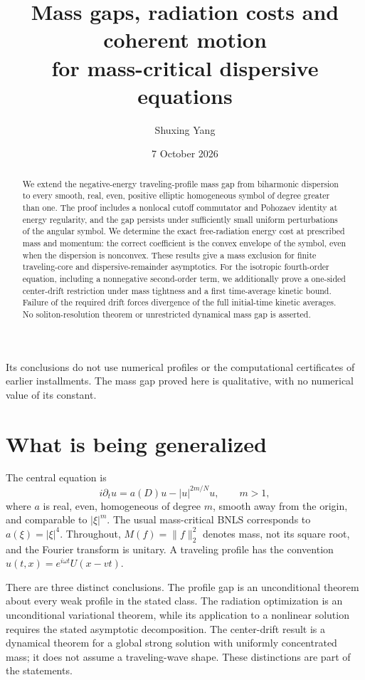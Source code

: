 \documentclass[11pt,a4paper]{article}
\title{Mass gaps, radiation costs and coherent motion\\for mass-critical dispersive equations}
\author{Shuxing Yang}
\date{7 October 2026}
\theoremstyle{remark}\newtheorem{remark}[theorem]{Remark}
\begin{document}
\maketitle
\begin{abstract}
We extend the negative-energy traveling-profile mass gap from biharmonic dispersion to every smooth, real, even, positive elliptic homogeneous symbol of degree greater than one. The proof includes a nonlocal cutoff commutator and Pohozaev identity at energy regularity, and the gap persists under sufficiently small uniform perturbations of the angular symbol. We determine the exact free-radiation energy cost at prescribed mass and momentum: the correct coefficient is the convex envelope of the symbol, even when the dispersion is nonconvex. These results give a mass exclusion for finite traveling-core and dispersive-remainder asymptotics. For the isotropic fourth-order equation, including a nonnegative second-order term, we additionally prove a one-sided center-drift restriction under mass tightness and a first time-average kinetic bound. Failure of the required drift forces divergence of the full initial-time kinetic averages. No soliton-resolution theorem or unrestricted dynamical mass gap is asserted.
\end{abstract}
 Its conclusions do not use numerical profiles or the computational certificates of earlier installments. The mass gap proved here is qualitative, with no numerical value of its constant.

\section*{What is being generalized}
The central equation is
\[
 i\partial_t u=a(D)u-|u|^{2m/N}u,\qquad m>1,
\]
where $a$ is real, even, homogeneous of degree $m$, smooth away from the origin, and comparable to $|\xi|^m$. The usual mass-critical BNLS corresponds to $a(\xi)=|\xi|^4$. Throughout, $M(f)=\|f\|_2^2$ denotes mass, not its square root, and the Fourier transform is unitary. A traveling profile has the convention $u(t,x)=e^{i\omega t}U(x-vt)$.

There are three distinct conclusions. The profile gap is an unconditional theorem about every weak profile in the stated class. The radiation optimization is an unconditional variational theorem, while its application to a nonlinear solution requires the stated asymptotic decomposition. The center-drift result is a dynamical theorem for a global strong solution with uniformly concentrated mass; it does not assume a traveling-wave shape. These distinctions are part of the statements.
\end{document}
